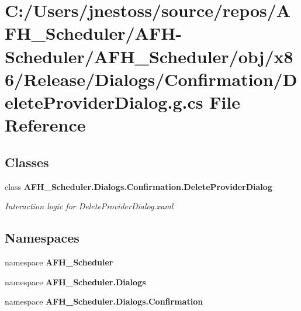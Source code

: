 \section{C\+:/\+Users/jnestoss/source/repos/\+A\+F\+H\+\_\+\+Scheduler/\+A\+F\+H-\/\+Scheduler/\+A\+F\+H\+\_\+\+Scheduler/obj/x86/\+Release/\+Dialogs/\+Confirmation/\+Delete\+Provider\+Dialog.g.\+cs File Reference}
\label{x86_2_release_2_dialogs_2_confirmation_2_delete_provider_dialog_8g_8cs}
\subsection*{Classes}
\begin{DoxyCompactItemize}
\item 
class \textbf{ A\+F\+H\+\_\+\+Scheduler.\+Dialogs.\+Confirmation.\+Delete\+Provider\+Dialog}
\begin{DoxyCompactList}\small\item\em Interaction logic for Delete\+Provider\+Dialog.\+xaml \end{DoxyCompactList}\end{DoxyCompactItemize}
\subsection*{Namespaces}
\begin{DoxyCompactItemize}
\item 
namespace \textbf{ A\+F\+H\+\_\+\+Scheduler}
\item 
namespace \textbf{ A\+F\+H\+\_\+\+Scheduler.\+Dialogs}
\item 
namespace \textbf{ A\+F\+H\+\_\+\+Scheduler.\+Dialogs.\+Confirmation}
\end{DoxyCompactItemize}
